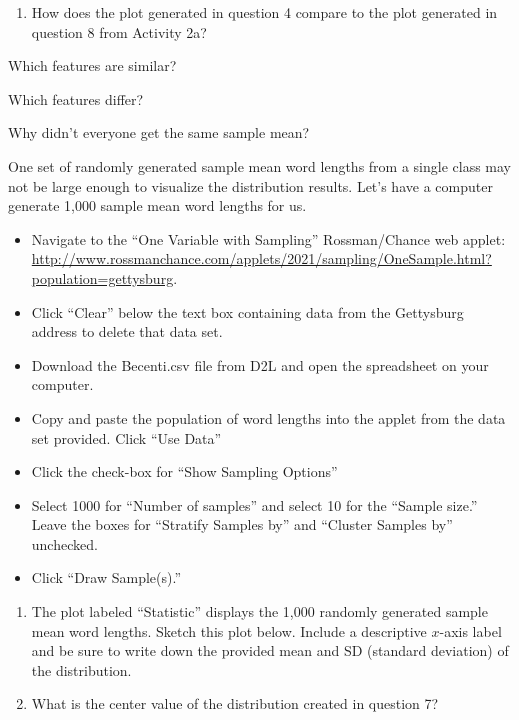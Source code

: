 \documentclass[
]{report}
\providecommand{\tightlist}{%
  \setlength{\itemsep}{0pt}\setlength{\parskip}{0pt}}
\newcommand{\rgi}{\hspace{24pt}}  %
\begin{document}
\newpage

\begin{enumerate}
\def\labelenumi{\arabic{enumi}.}
\setcounter{enumi}{5}
\tightlist
\item
  How does the plot generated in question 4 compare to the plot generated in question 8 from Activity 2a?
\end{enumerate}

\rgi Which features are similar?\\
\vspace{0.4in}

\rgi Which features differ?

\vspace{0.4in}

\rgi Why didn't everyone get the same sample mean?
\vspace{0.4in}

One set of randomly generated sample mean word lengths from a single class may not be large enough to visualize the distribution results. Let's have a computer generate 1,000 sample mean word lengths for us.

\begin{itemize}
\item
  Navigate to the ``One Variable with Sampling'' Rossman/Chance web applet: \url{http://www.rossmanchance.com/applets/2021/sampling/OneSample.html?population=gettysburg}.
\item
  Click ``Clear'' below the text box containing data from the Gettysburg address to delete that data set.
\item
  Download the Becenti.csv file from D2L and open the spreadsheet on your computer.
\item
  Copy and paste the population of word lengths into the applet from the data set provided. Click ``Use Data''
\item
  Click the check-box for ``Show Sampling Options''
\item
  Select 1000 for ``Number of samples'' and select 10 for the ``Sample size.'' Leave the boxes for ``Stratify Samples by'' and ``Cluster Samples by'' unchecked.
\item
  Click ``Draw Sample(s).''
\end{itemize}

\begin{enumerate}
\def\labelenumi{\arabic{enumi}.}
\setcounter{enumi}{6}
\item
  The plot labeled ``Statistic'' displays the 1,000 randomly generated sample mean word lengths. Sketch this plot below. Include a descriptive \(x\)-axis label and be sure to write down the provided mean and SD (standard deviation) of the distribution.
  \vspace{1.5in}
\item
  What is the center value of the distribution created in question 7?
  \vspace{0.3in}
\end{enumerate}
\end{document}
